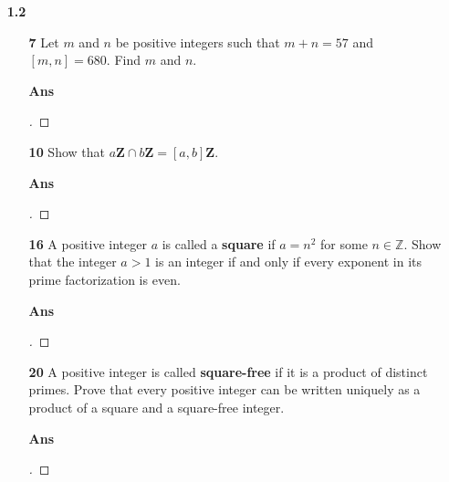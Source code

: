 \documentclass[paper=usletter, fontsize=12pt]{article}
\begin{document}
\begin{itemize}
\begin{itemize}
            \end{itemize}

        \item[\textbf{1.2}]

        \begin{itemize}

            \item[\textbf{7}] Let $m$ and $n$ be positive integers such that $m
            + n = 57$ and $[m, n] = 680$. Find $m$ and $n$.
            \item[\textbf{Ans}]
            \begin{proof}[\unskip\nopunct]
            \end{proof}
            \vspace{0.2in}

            \item[\textbf{10}] Show that $a\textbf{Z} \cap b\textbf{Z} = [a,
            b]\textbf{Z}$.
            \item[\textbf{Ans}]
            \begin{proof}[\unskip\nopunct]
            \end{proof}
            \vspace{0.2in}

            \item[\textbf{16}] A positive integer $a$ is called a
            \textbf{square} if $a = n^2$ for some $n \in \mathbb{Z}$. Show that
            the integer $a > 1$ is an integer if and only if every exponent in
            its prime factorization is even.
            \item[\textbf{Ans}]
            \begin{proof}[\unskip\nopunct]
            \end{proof}
            \vspace{0.2in}

            \item[\textbf{20}] A positive integer is called \textbf{square-free} if it is a product of distinct primes. Prove that every
            positive integer can be written uniquely as a product of a square
            and a square-free integer.
            \item[\textbf{Ans}]
            \begin{proof}[\unskip\nopunct]
            \end{proof}
            \vspace{0.2in}

        \end{itemize}

    \end{itemize}
\end{document}
